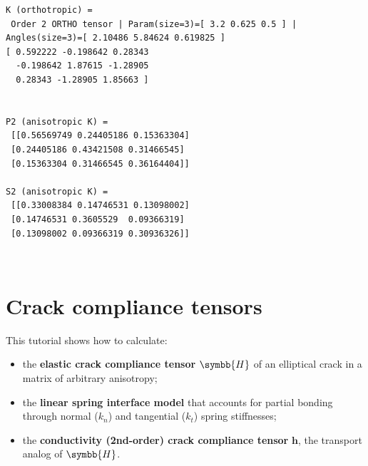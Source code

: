 \documentclass[
  a4paper,
  numbers=noendperiod,
  DIV=12]{scrreprt}
\providecommand{\tightlist}{%
  \setlength{\itemsep}{0pt}\setlength{\parskip}{0pt}}
\newcommand{\uu}[1]{{\symbf{{#1}}}}
\newcommand{\uuuu}[1]{{\symbb{{#1}}}}
\begin{document}
\begin{verbatim}
K (orthotropic) =
 Order 2 ORTHO tensor | Param(size=3)=[ 3.2 0.625 0.5 ] | Angles(size=3)=[ 2.10486 5.84624 0.619825 ]
[ 0.592222 -0.198642 0.28343 
  -0.198642 1.87615 -1.28905 
  0.28343 -1.28905 1.85663 ]
 

P2 (anisotropic K) =
 [[0.56569749 0.24405186 0.15363304]
 [0.24405186 0.43421508 0.31466545]
 [0.15363304 0.31466545 0.36164404]]

S2 (anisotropic K) =
 [[0.33008384 0.14746531 0.13098002]
 [0.14746531 0.3605529  0.09366319]
 [0.13098002 0.09366319 0.30936326]]
\end{verbatim}

\(\,\)

\chapter{Crack compliance tensors}\label{sec-crack_compliance}

\begin{tcolorbox}[enhanced jigsaw, arc=.35mm, bottomrule=.15mm, bottomtitle=1mm, breakable, colback=white, colbacktitle=quarto-callout-important-color!10!white, colframe=quarto-callout-important-color-frame, coltitle=black, left=2mm, leftrule=.75mm, opacityback=0, opacitybacktitle=0.6, rightrule=.15mm, title={Objectives}, titlerule=0mm, toprule=.15mm, toptitle=1mm]

This tutorial shows how to calculate:

\begin{itemize}
\tightlist
\item
  the \textbf{elastic crack compliance tensor} \(\uuuu{H}\) of an
  elliptical crack in a matrix of arbitrary anisotropy;
\item
  the \textbf{linear spring interface model} that accounts for partial
  bonding through normal (\(k_n\)) and tangential (\(k_t\)) spring
  stiffnesses;
\item
  the \textbf{conductivity (2nd-order) crack compliance tensor}
  \(\uu{h}\), the transport analog of \(\uuuu{H}\).
\end{itemize}

\end{tcolorbox}
\end{document}
